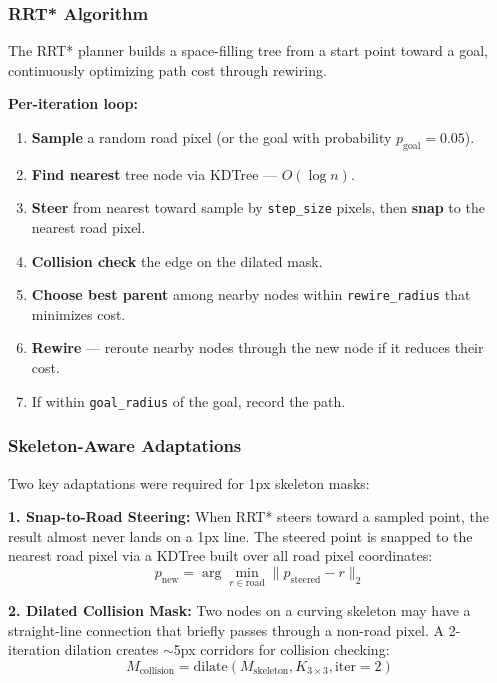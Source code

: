 \documentclass[conference,twocolumn]{IEEEtran}
\begin{document}
\subsubsection{RRT* Algorithm}

The RRT* planner builds a space-filling tree from a start point toward a goal, continuously optimizing path cost through rewiring.

\textbf{Per-iteration loop:}
\begin{enumerate}
    \item \textbf{Sample} a random road pixel (or the goal with probability $p_{\text{goal}} = 0.05$).
    \item \textbf{Find nearest} tree node via KDTree — $O(\log n)$.
    \item \textbf{Steer} from nearest toward sample by \texttt{step\_size} pixels, then \textbf{snap} to the nearest road pixel.
    \item \textbf{Collision check} the edge on the dilated mask.
    \item \textbf{Choose best parent} among nearby nodes within \texttt{rewire\_radius} that minimizes cost.
    \item \textbf{Rewire} — reroute nearby nodes through the new node if it reduces their cost.
    \item If within \texttt{goal\_radius} of the goal, record the path.
\end{enumerate}

\subsubsection{Skeleton-Aware Adaptations}

Two key adaptations were required for 1px skeleton masks:

\textbf{1. Snap-to-Road Steering:} When RRT* steers toward a sampled point, the result almost never lands on a 1px line. The steered point is snapped to the nearest road pixel via a KDTree built over all road pixel coordinates:
\begin{equation}
    p_{\text{new}} = \arg\min_{r \in \text{road}} \| p_{\text{steered}} - r \|_2
\end{equation}

\textbf{2. Dilated Collision Mask:} Two nodes on a curving skeleton may have a straight-line connection that briefly passes through a non-road pixel. A 2-iteration dilation creates $\sim$5px corridors for collision checking:
\begin{equation}
    M_{\text{collision}} = \text{dilate}(M_{\text{skeleton}}, K_{3\times3}, \text{iter}=2)
\end{equation}
\end{document}
